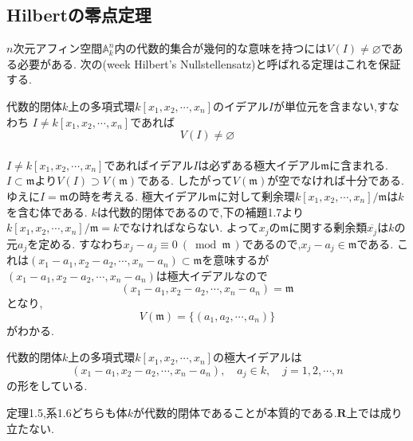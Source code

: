 \documentclass[dvipdfmx,a4paper,11pt]{jsarticle}
\begin{document}
\subsection{Hilbertの零点定理}

$n$次元アフィン空間$\mathbb{A}^{n}_{k}$内の代数的集合が幾何的な意味を持つには$V(I)\neq \varnothing$である必要がある.
次の(week Hilbert's Nullstellensatz)と呼ばれる定理はこれを保証する.
\begin{tcolorbox}[title = 定理1.5,upperbox = visible]
  代数的閉体$k$上の多項式環$k[x_{1},x_{2},\cdots,x_{n}]$のイデアル$I$が単位元を含まない,すなわち
  $I\neq k[x_{1},x_{2},\cdots,x_{n}]$であれば
  \begin{equation*}
    V(I)\neq \varnothing
  \end{equation*}
  \tcblower
  \\
  $I\neq k[x_{1},x_{2},\cdots,x_{n}]$であればイデアル$I$は必ずある極大イデアル$\mathfrak{m}$に含まれる.
  $I\subset \mathfrak{m}$より$V(I)\supset V(\mathfrak{m})$である.
  したがって$V(\mathfrak{m})$が空でなければ十分である.ゆえに$I=\mathfrak{m}$の時を考える.
  極大イデアル$\mathfrak{m}$に対して剰余環$k[x_{1},x_{2},\cdots,x_{n}]/\mathfrak{m}$は$k$を含む体である.
  $k$は代数的閉体であるので,下の補題1.7より$k[x_{1},x_{2},\cdots,x_{n}]/\mathfrak{m}=k$でなければならない.
  よって$x_{j}$の$\mathfrak{m}$に関する剰余類$\overline{x_{j}}$は$k$の元$a_{j}$を定める.
  すなわち$x_{j}-a_{j}\equiv 0\ (\! \bmod \mathfrak{m}\, )$であるので,$x_{j}-a_{j}\in \mathfrak{m}$である.
  これは$(x_{1}-a_{1},x_{2}-a_{2},\cdots,x_{n}-a_{n})\subset \mathfrak{m}$を意味するが$(x_{1}-a_{1},x_{2}-a_{2},\cdots,x_{n}-a_{n})$は極大イデアルなので
  \begin{equation*}
    (x_{1}-a_{1},x_{2}-a_{2},\cdots,x_{n}-a_{n})=\mathfrak{m}
  \end{equation*}
  となり,
  \begin{equation*}
    V(\mathfrak{m})=\{(a_{1},a_{2},\cdots,a_{n})\}
  \end{equation*}
  がわかる.
\end{tcolorbox}
\begin{tcolorbox}[title = 系1.6]
  代数的閉体$k$上の多項式環$k[x_{1},x_{2},\cdots,x_{n}]$の極大イデアルは
  \begin{equation*}
    (x_{1}-a_{1},x_{2}-a_{2},\cdots,x_{n}-a_{n}),\quad a_{j}\in k,\quad j = 1,2,\cdots,n
  \end{equation*}
  の形をしている.
\end{tcolorbox}
定理1.5,系1.6どちらも体$k$が代数的閉体であることが本質的である.$\mathbf{R}$上では成り立たない.
\end{document}
